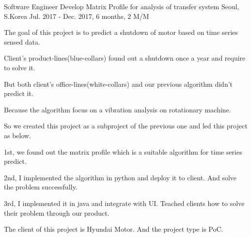 \begin{cventries}
  \cventry
    {Software Engineer} %
    {Develop Matrix Profile for analysis of transfer system} %
    {Seoul, S.Korea} %
    {Jul. 2017 - Dec. 2017, 6 months, 2 M/M} %
    {
      \begin{cvitems} %
        \item {The goal of this project is to predict a shutdown of motor based on time series sensed data.}
        \item {Client's product-lines(blue-collars) found out a shutdown once a year and require to solve it.}
        \item {But both client's office-lines(white-collars) and our previous algorithm didn't predict it.}
        \item {Because the algorithm focus on a vibration analysis on rotationary machine.}
        \item {So we created this project as a subproject of the previous one and led this project as below.}
        \item {1st, we found out the matrix profile which is a suitable algorithm for time series predict.}
        \item {2nd, I implemented the algorithm in python and deploy it to client. And solve the problem successfully.}
        \item {3rd, I implemented it in java and integrate with UI. Teached clients how to solve their problem through our product.}
        \item {The client of this project is Hyundai Motor. And the project type is PoC.}
      \end{cvitems}
    }


\end{cventries}
